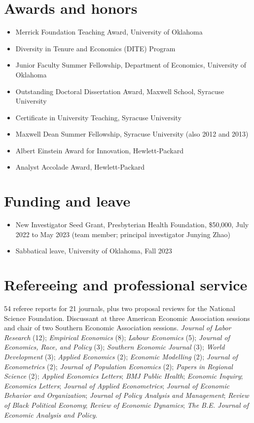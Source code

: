 \documentclass[10.5pt]{article}
\begin{document}
\section{Awards and honors}
\begin{itemize}
\item[\textbf{2026}] Merrick Foundation Teaching Award, University of Oklahoma
\item[\textbf{2017}] Diversity in Tenure and Economics (DITE) Program
\item[\textbf{2015}] Junior Faculty Summer Fellowship, Department of Economics, University of Oklahoma
\item[\textbf{2014}] Outstanding Doctoral Dissertation Award, Maxwell School, Syracuse University
\item[\textbf{2013}] Certificate in University Teaching, Syracuse University
\item[\textbf{2010}] Maxwell Dean Summer Fellowship, Syracuse University (also 2012 and 2013)
\item[\textbf{2008}] Albert Einstein Award for Innovation, Hewlett-Packard
\item[\textbf{2007}] Analyst Accolade Award, Hewlett-Packard
\end{itemize}
\section{Funding and leave}
\begin{itemize}
\item New Investigator Seed Grant, Presbyterian Health Foundation, \$50,000, July 2022 to May 2023 (team member; principal investigator Junying Zhao)
\item Sabbatical leave, University of Oklahoma, Fall 2023
\end{itemize}
\section{Refereeing and professional service}
54 referee reports for 21 journals, plus two proposal reviews for the National Science Foundation. Discussant at three American Economic Association sessions and chair of two Southern Economic Association sessions.
{\small \emph{Journal of Labor Research} (12); \emph{Empirical Economics} (8); \emph{Labour Economics} (5); \emph{Journal of Economics, Race, and Policy} (3); \emph{Southern Economic Journal} (3); \emph{World Development} (3); \emph{Applied Economics} (2); \emph{Economic Modelling} (2); \emph{Journal of Econometrics} (2); \emph{Journal of Population Economics} (2); \emph{Papers in Regional Science} (2); \emph{Applied Economics Letters}; \emph{BMJ Public Health}; \emph{Economic Inquiry}; \emph{Economics Letters}; \emph{Journal of Applied Econometrics}; \emph{Journal of Economic Behavior and Organization}; \emph{Journal of Policy Analysis and Management}; \emph{Review of Black Political Economy}; \emph{Review of Economic Dynamics}; \emph{The B.E. Journal of Economic Analysis and Policy}.}
\end{document}
